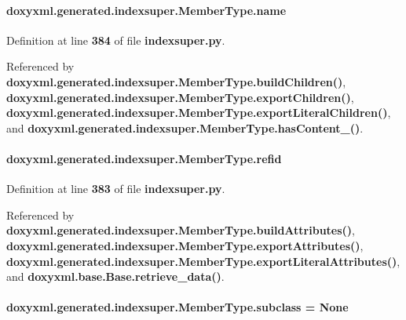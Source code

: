 \paragraph[{name}]{\setlength{\rightskip}{0pt plus 5cm}doxyxml.\+generated.\+indexsuper.\+Member\+Type.\+name}\label{classdoxyxml_1_1generated_1_1indexsuper_1_1MemberType_a32900ca853a13daac77985e1722d7d71}


Definition at line {\bf 384} of file {\bf indexsuper.\+py}.



Referenced by {\bf doxyxml.\+generated.\+indexsuper.\+Member\+Type.\+build\+Children()}, {\bf doxyxml.\+generated.\+indexsuper.\+Member\+Type.\+export\+Children()}, {\bf doxyxml.\+generated.\+indexsuper.\+Member\+Type.\+export\+Literal\+Children()}, and {\bf doxyxml.\+generated.\+indexsuper.\+Member\+Type.\+has\+Content\+\_\+()}.

\paragraph[{refid}]{\setlength{\rightskip}{0pt plus 5cm}doxyxml.\+generated.\+indexsuper.\+Member\+Type.\+refid}\label{classdoxyxml_1_1generated_1_1indexsuper_1_1MemberType_a51c4dd315015e55a95726b6d1d810e58}


Definition at line {\bf 383} of file {\bf indexsuper.\+py}.



Referenced by {\bf doxyxml.\+generated.\+indexsuper.\+Member\+Type.\+build\+Attributes()}, {\bf doxyxml.\+generated.\+indexsuper.\+Member\+Type.\+export\+Attributes()}, {\bf doxyxml.\+generated.\+indexsuper.\+Member\+Type.\+export\+Literal\+Attributes()}, and {\bf doxyxml.\+base.\+Base.\+retrieve\+\_\+data()}.

\paragraph[{subclass}]{\setlength{\rightskip}{0pt plus 5cm}doxyxml.\+generated.\+indexsuper.\+Member\+Type.\+subclass = None\hspace{0.3cm}{\ttfamily [static]}}\label{classdoxyxml_1_1generated_1_1indexsuper_1_1MemberType_a10bc3e22be14341327df733c482cfb19}


